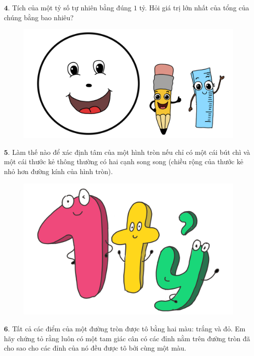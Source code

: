 \begin{multicols}{2}
\begin{figure}[H]
		\vspace*{-15pt}
	\end{figure}
	$\pmb{4.}$ Tích của một tỷ số tự nhiên bằng đúng $1$ tỷ. Hỏi giá trị lớn nhất của tổng của chúng bằng bao nhiêu?
	\begin{figure}[H]
		\centering
		\vspace*{5pt}
		\captionsetup{labelformat= empty, justification=centering}
		\includegraphics[width=1\linewidth]{bai4}
		\vspace*{-15pt}
	\end{figure}
	$\pmb{5.}$ Làm thế nào để xác định tâm của một hình tròn nếu chỉ có một cái bút chì và một cái thước kẻ thông thường có hai cạnh song song (chiều rộng của thước kẻ nhỏ hơn đường kính của hình tròn).
	\begin{figure}[H]
		\centering
		\vspace*{-5pt}
		\captionsetup{labelformat= empty, justification=centering}
		\includegraphics[width=1\linewidth]{bai5}
		\vspace*{-15pt}
	\end{figure}
	$\pmb{6.}$ Tất cả các điểm của một đường tròn được tô bằng hai màu: trắng và đỏ. Em hãy chứng tỏ rằng luôn có một tam giác cân có các đỉnh nằm trên đường tròn đã cho sao cho các đỉnh của nó đều được tô bởi cùng một màu.

\end{multicols}
